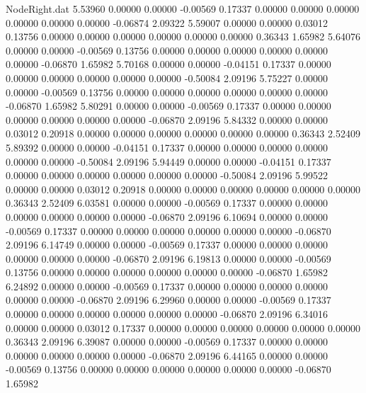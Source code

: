 \begin{filecontents}{NodeRight.dat}
   5.53960    0.00000    0.00000    -0.00569    0.17337    0.00000    0.00000    0.00000    0.00000    0.00000    0.00000   -0.06874    2.09322
   5.59007    0.00000    0.00000     0.03012    0.13756    0.00000    0.00000    0.00000    0.00000    0.00000    0.00000    0.36343    1.65982
   5.64076    0.00000    0.00000    -0.00569    0.13756    0.00000    0.00000    0.00000    0.00000    0.00000    0.00000   -0.06870    1.65982
   5.70168    0.00000    0.00000    -0.04151    0.17337    0.00000    0.00000    0.00000    0.00000    0.00000    0.00000   -0.50084    2.09196
   5.75227    0.00000    0.00000    -0.00569    0.13756    0.00000    0.00000    0.00000    0.00000    0.00000    0.00000   -0.06870    1.65982
   5.80291    0.00000    0.00000    -0.00569    0.17337    0.00000    0.00000    0.00000    0.00000    0.00000    0.00000   -0.06870    2.09196
   5.84332    0.00000    0.00000     0.03012    0.20918    0.00000    0.00000    0.00000    0.00000    0.00000    0.00000    0.36343    2.52409
   5.89392    0.00000    0.00000    -0.04151    0.17337    0.00000    0.00000    0.00000    0.00000    0.00000    0.00000   -0.50084    2.09196
   5.94449    0.00000    0.00000    -0.04151    0.17337    0.00000    0.00000    0.00000    0.00000    0.00000    0.00000   -0.50084    2.09196
   5.99522    0.00000    0.00000     0.03012    0.20918    0.00000    0.00000    0.00000    0.00000    0.00000    0.00000    0.36343    2.52409
   6.03581    0.00000    0.00000    -0.00569    0.17337    0.00000    0.00000    0.00000    0.00000    0.00000    0.00000   -0.06870    2.09196
   6.10694    0.00000    0.00000    -0.00569    0.17337    0.00000    0.00000    0.00000    0.00000    0.00000    0.00000   -0.06870    2.09196
   6.14749    0.00000    0.00000    -0.00569    0.17337    0.00000    0.00000    0.00000    0.00000    0.00000    0.00000   -0.06870    2.09196
   6.19813    0.00000    0.00000    -0.00569    0.13756    0.00000    0.00000    0.00000    0.00000    0.00000    0.00000   -0.06870    1.65982
   6.24892    0.00000    0.00000    -0.00569    0.17337    0.00000    0.00000    0.00000    0.00000    0.00000    0.00000   -0.06870    2.09196
   6.29960    0.00000    0.00000    -0.00569    0.17337    0.00000    0.00000    0.00000    0.00000    0.00000    0.00000   -0.06870    2.09196
   6.34016    0.00000    0.00000     0.03012    0.17337    0.00000    0.00000    0.00000    0.00000    0.00000    0.00000    0.36343    2.09196
   6.39087    0.00000    0.00000    -0.00569    0.17337    0.00000    0.00000    0.00000    0.00000    0.00000    0.00000   -0.06870    2.09196
   6.44165    0.00000    0.00000    -0.00569    0.13756    0.00000    0.00000    0.00000    0.00000    0.00000    0.00000   -0.06870    1.65982

\end{filecontents}
